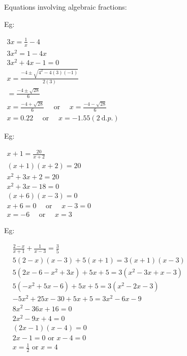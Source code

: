 \documentclass[twocolumn]{article}
\begin{document}
\bigskip

\noindent
Equations involving algebraic fractions:

\bigskip

\noindent
Eg:

\noindent 
$\begin{gathered}
	3 x=\frac{1}{x}-4 \\ 
	3 x^2=1-4 x \\ 
	3 x^2+4 x-1=0 \\ 
	x=\frac{-4 \pm \sqrt{4^2-4(3)(-1)}}{2(3)} \\ 
	=\frac{-4 \pm \sqrt{28}}{6} \\ 
	x=\frac{-4+\sqrt{28}}{6} \quad \text { or } \quad x=\frac{-4-\sqrt{28}}{6} \\ 
	x=0.22 \quad \text { or } \quad x=-1.55(2 \mathrm{~d} . p .)\end{gathered}$

\bigskip

\noindent
Eg:

\noindent 
$\begin{gathered}
x+1  =\frac{20}{x+2} \\ (x+1)(x+2) =20 \\ x^2+3 x+2  =20 \\ x^2+3 x-18  =0  \\ (x+6)(x-3)  =0 \\
	x+6=0 \quad \text { or } \quad x-3  =0 \\ 
	x=-6 \quad \text { or } \quad x  =3 
\end{gathered}$

\bigskip

\noindent
Eg:

\noindent 
$\begin{aligned} & \frac{2-x}{x+1}+\frac{1}{x-3}=\frac{3}{5} \\ & 5(2-x)(x-3)+5(x+1)=3(x+1)(x-3) \\ & 5\left(2 x-6-x^2+3 x\right)+5 x+5=3\left(x^2-3 x+x-3\right) \\ & 5\left(-x^2+5 x-6\right)+5 x+5=3\left(x^2-2 x-3\right) \\ &-5 x^2+25 x-30+5 x+5=3 x^2-6 x-9 \\ & 8 x^2-36 x+16=0 \\ & 2 x^2-9 x+4=0 \\ &(2 x-1)(x-4)=0 \\ &  2 x-1=0 \text { or } x-4=0 \\ & x=\frac{1}{2} \text { or } x=4\end{aligned}$
\end{document}
